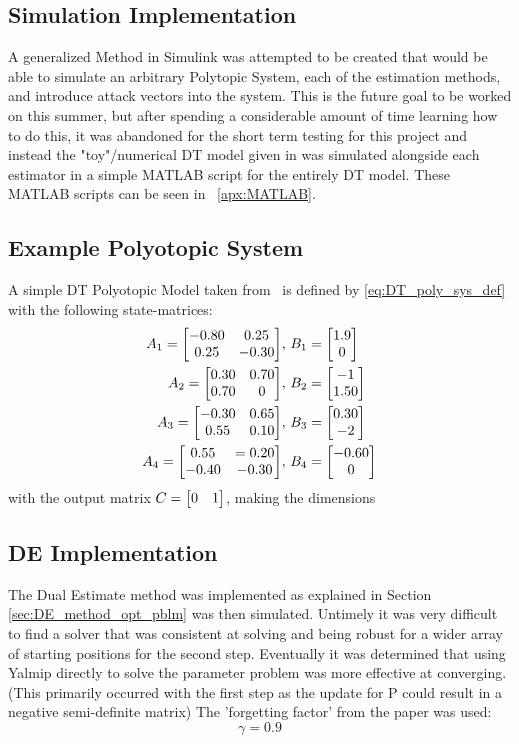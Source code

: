 \documentclass[]{article}
\begin{document}
\subsection{Simulation Implementation}
A generalized Method in Simulink was attempted to be created that would be able to simulate an arbitrary Polytopic System, each of the estimation methods, and introduce attack vectors into the system. This is the future goal to be worked on this summer, but after spending a considerable amount of time learning how to do this, it was abandoned for the short term testing for this project and instead the "toy"/numerical DT model given in \cite{beelen2017joint} was simulated alongside each estimator in a simple MATLAB script for the entirely DT model. These MATLAB scripts can be seen in \appendixname \ \ref{apx:MATLAB}.

\subsection{Example Polyotopic System}
A simple DT Polyotopic Model taken from \cite{beelen2017joint} \ is defined by \eqref{eq:DT_poly_sys_def} with the following state-matrices:
\begin{equation}
	\begin{aligned}
		A_1 = \mqty[-0.80 & 0.25\\ 0.25 & -0.30], \ &B_1 = \mqty[1.9\\0]\\
		A_2 = \mqty[0.30 & 0.70\\ 0.70 &0], \ &B_2 = \mqty[-1\\ 1.50]\\
		A_3 = \mqty[-0.30 & 0.65\\ 0.55 &0.10], \ &B_3 = \mqty[0.30\\ -2]\\
		A_4 = \mqty[0.55 & =0.20\\ -0.40 &-0.30], \ &B_4 = \mqty[-0.60\\0]
	\end{aligned}
\end{equation}
with the output matrix $C = \mqty[0 &1]$, making the dimensions 

\subsection{DE Implementation}
The Dual Estimate method was implemented as explained in Section \ref{sec:DE_method_opt_pblm} was then simulated. Untimely it was very difficult to find a solver that was consistent at solving and being robust for a wider array of starting positions for the second step. Eventually it was determined that using Yalmip directly to solve the parameter problem was more effective at converging. (This primarily occurred with the first step as the update for P could result in a negative semi-definite matrix) The 'forgetting factor' from the paper was used: $$\gamma = 0.9$$
\end{document}
